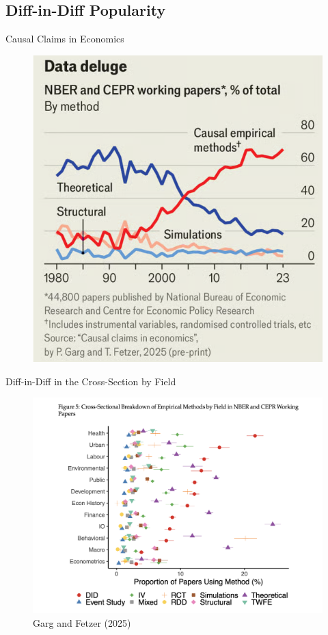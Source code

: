 \documentclass{beamer}
\begin{document}
\subsection{Diff-in-Diff Popularity}

\begin{frame}{Causal Claims in Economics}

	\begin{figure}
	\includegraphics[scale=0.4]{./lecture_includes/causal_claims}
	\end{figure}

\end{frame}


\begin{frame}{Diff-in-Diff in the Cross-Section by Field}

	\begin{figure}
	\caption{Garg and Fetzer (2025)}
	\includegraphics[scale=0.25]{./lecture_includes/did_growth2}
	\end{figure}

\end{frame}
\end{document}
